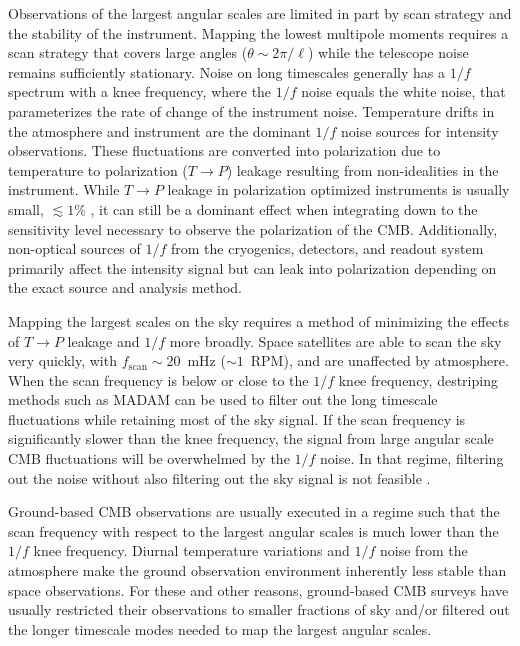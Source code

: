 \documentclass[twocolumn, tighten, numberedappendix, twocolappendix]{aastex63}
\begin{document}
Observations of the largest angular scales are limited in part by scan strategy and the stability of the instrument. Mapping the lowest multipole moments requires a scan strategy that covers large angles ($\theta\sim2\pi/\ell$) while the telescope noise remains sufficiently stationary. Noise on long timescales generally has a $1/f$ spectrum with a knee frequency, where the $1/f$ noise equals the white noise, that parameterizes the rate of change of the instrument noise. Temperature drifts in the atmosphere and instrument are the dominant $1/f$ noise sources for intensity observations. These fluctuations are converted into polarization due to temperature to polarization ($T\rightarrow P$) leakage resulting from non-idealities in the instrument. While $T \rightarrow P$ leakage in polarization optimized instruments is usually small, $\lesssim1\%$ \citep{essinger2016}, it can still be a dominant effect when integrating down to the sensitivity level necessary to observe the polarization of the CMB. Additionally, non-optical sources of $1/f$ from the cryogenics, detectors, and readout system primarily affect the intensity signal but can leak into polarization depending on the exact source and analysis method.

Mapping the largest scales on the sky requires a method of minimizing the effects of $T\rightarrow P$ leakage and $1/f$ more broadly. Space satellites are able to scan the sky very quickly, with $f_\mathrm{scan} \sim 20$~mHz ($\sim 1$~RPM), and are unaffected by atmosphere. When the scan frequency is below or close to the $1/f$ knee frequency, destriping methods such as MADAM \citep{madam2010} can be used to filter out the long timescale fluctuations while retaining most of the sky signal. If the scan frequency is significantly slower than the knee frequency, the signal from large angular scale CMB fluctuations will be overwhelmed by the $1/f$ noise. In that regime, filtering out the noise without also filtering out the sky signal is not feasible \citep{poletti2016}.

Ground-based CMB observations are usually executed in a regime such that the scan frequency with respect to the largest angular scales is much lower than the $1/f$ knee frequency. Diurnal temperature variations and $1/f$ noise from the atmosphere make the ground observation environment inherently less stable than space observations. For these and other reasons, ground-based CMB surveys have usually restricted their observations to smaller fractions of sky and/or filtered out the longer timescale modes needed to map the largest angular scales. 
\end{document}
